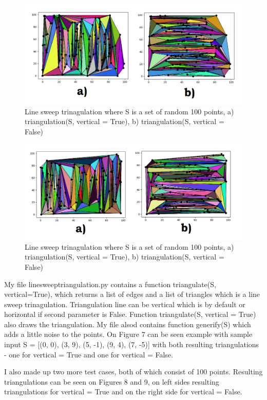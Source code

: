 \documentclass[12pt]{article}
\begin{document}
	\begin{figure}
		\centering
		\includegraphics[scale=0.5] {graf8}
		\caption{\label{fig:8} Line sweep trinagulation where S is a set of random 100 points, a)  triangulation(S, vertical = True), b) triangulation(S, vertical = False) }
	\end{figure}
	
	\begin{figure}
		\centering
		\includegraphics[scale=0.5] {graf9}
		\caption{\label{fig:9} Line sweep trinagulation where S is a set of random 100 points, a)  triangulation(S, vertical = True), b) triangulation(S, vertical = False) }
	\end{figure}
	My file linesweeptriangulation.py contains a function triangulate(S, vertical=True), which returns a list of edges and a list of triangles which is a line sweep trinagulation. Triangulation line can be vertical which is by default or horizontal if second parameter is False. Function triangulate(S, vertical = True) also draws the triangulation. My file alsod contains function generify(S) which adds a little noise to the points. On Figure 7 can be seen example with sample input S = [(0, 0), (3, 9), (5, -1), (9, 4), (7, -5)] with both resulting triangulations - one for vertical = True and one for vertical = False.
	
	I also made up two more test cases, both of which consist of 100 points. Resulting triangulations can be seen on Figures 8 and 9, on left sides resulting triangulations for vertical = True and on the right side for vertical = False.
	
\end{document}

